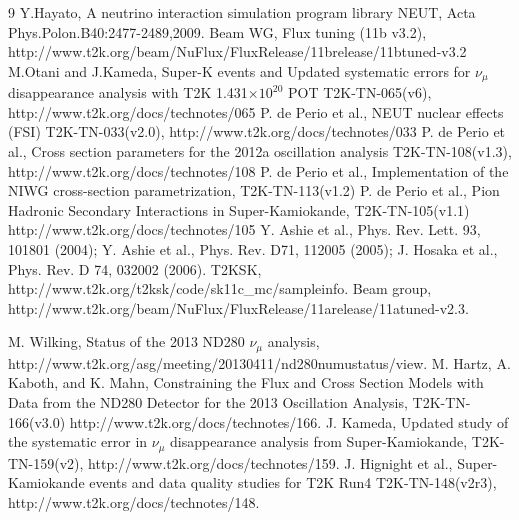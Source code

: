 \begin{thebibliography}{9}
%
%
  Y.Hayato, A neutrino interaction simulation program library NEUT,
  Acta Phys.Polon.B40:2477-2489,2009.
   Beam WG, Flux tuning (11b v3.2), http://www.t2k.org/beam/NuFlux/FluxRelease/11brelease/11btuned-v3.2
   M.Otani and J.Kameda,
   Super-K events and Updated systematic errors for $\nu_\mu$ disappearance analysis with T2K 1.431$\times10^{20}$ POT
   T2K-TN-065(v6),
   http://www.t2k.org/docs/technotes/065
  P. de Perio et al.,
  NEUT nuclear effects (FSI)
  T2K-TN-033(v2.0),
  http://www.t2k.org/docs/technotes/033
  P. de Perio et al.,
  Cross section parameters for the 2012a oscillation analysis
  T2K-TN-108(v1.3),
  http://www.t2k.org/docs/technotes/108
  P. de Perio et al.,
  Implementation of the NIWG cross-section parametrization,
  T2K-TN-113(v1.2) 
  P. de Perio et al.,
  Pion Hadronic Secondary Interactions in Super-Kamiokande,
  T2K-TN-105(v1.1)
  http://www.t2k.org/docs/technotes/105
  Y. Ashie et al., Phys. Rev. Lett. 93, 101801 (2004);
  Y. Ashie et al., Phys. Rev. D71, 112005 (2005); 
  J. Hosaka et al., Phys. Rev. D 74, 032002 (2006).
  T2KSK,
  http://www.t2k.org/t2ksk/code/sk11c\_mc/sampleinfo.
  Beam group,
  http://www.t2k.org/beam/NuFlux/FluxRelease/11arelease/11atuned-v2.3.

%
%

  M. Wilking,
  Status of the 2013 ND280 $\nu_{\mu}$ analysis,
  http://www.t2k.org/asg/meeting/20130411/nd280numustatus/view.
  M. Hartz, A. Kaboth, and K. Mahn,
  Constraining the Flux and Cross Section Models with Data from the
  ND280 Detector for the 2013 Oscillation Analysis,
  T2K-TN-166(v3.0)
  http://www.t2k.org/docs/technotes/166.
   J. Kameda,
   Updated study of the systematic error in $\nu_{\mu}$ disappearance analysis from Super-Kamiokande,
   T2K-TN-159(v2),
   http://www.t2k.org/docs/technotes/159.
   J. Hignight et al.,
   Super-Kamiokande events and data quality studies for T2K Run4
   T2K-TN-148(v2r3),
   http://www.t2k.org/docs/technotes/148.


\end{thebibliography}
